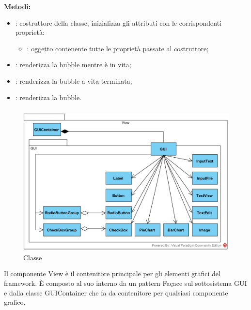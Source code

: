 \textbf{Metodi:}
\begin{itemize}
	\item {}: costruttore della classe, inizializza gli attributi con le corrispondenti proprietà:
	\begin{itemize}
		\item {}: oggetto contenente tutte le proprietà passate al costruttore;
	\end{itemize}
	\item {}: renderizza la bubble mentre è in vita;
	\item {}: renderizza la bubble a vita terminata;
	\item {}: renderizza la bubble.
\end{itemize}

\subsubsection[::View]{\class}\label{\class}
\begin{figure}[H]
	\centering
	\includegraphics[width=15cm]{./diagrammi/framework/view.png}
	\caption{Classe \class}
\end{figure}
Il componente View è il contenitore principale per gli elementi grafici del framework. È composto al suo interno da un pattern Fa\c{c}ace sul sottosistema GUI e dalla classe GUIContainer che fa da contenitore per qualsiasi componente grafico.

